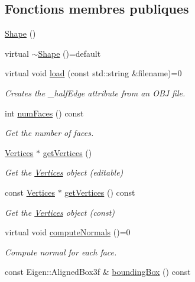 \subsection*{Fonctions membres publiques}
\begin{DoxyCompactItemize}
\item 
\hyperlink{class_shape_aaa8d87171e65e0d8ba3c5459978992a7}{Shape} ()
\item 
virtual \hyperlink{class_shape_ac8ad2fd02e1e94beeb98e65ab795cd56}{$\sim$\+Shape} ()=default
\item 
virtual void \hyperlink{class_shape_a20d654ec232b682c36cd8b28d2cba750}{load} (const std\+::string \&filename)=0
\begin{DoxyCompactList}\small\item\em Creates the \+\_\+half\+Edge attribute from an O\+BJ file. \end{DoxyCompactList}\item 
int \hyperlink{class_shape_aaa316f693b1679276dc2bc1014485ab3}{num\+Faces} () const
\begin{DoxyCompactList}\small\item\em Get the number of faces. \end{DoxyCompactList}\item 
\hyperlink{struct_shape_1_1_vertices}{Vertices} $\ast$ \hyperlink{class_shape_aacdf84a7934b19a50bf9d5b4cd122caf}{get\+Vertices} ()
\begin{DoxyCompactList}\small\item\em Get the \hyperlink{struct_shape_1_1_vertices}{Vertices} object (editable) \end{DoxyCompactList}\item 
const \hyperlink{struct_shape_1_1_vertices}{Vertices} $\ast$ \hyperlink{class_shape_ac40943613d4b7480d305d807abeb01e0}{get\+Vertices} () const
\begin{DoxyCompactList}\small\item\em Get the \hyperlink{struct_shape_1_1_vertices}{Vertices} object (const) \end{DoxyCompactList}\item 
virtual void \hyperlink{class_shape_afd886ad433d08a566003073bfd837f40}{compute\+Normals} ()=0
\begin{DoxyCompactList}\small\item\em Compute normal for each face. \end{DoxyCompactList}\item 
const Eigen\+::\+Aligned\+Box3f \& \hyperlink{class_shape_acd24561b01d6769b4a0c96cd0237a961}{bounding\+Box} () const

\end{DoxyCompactItemize}
